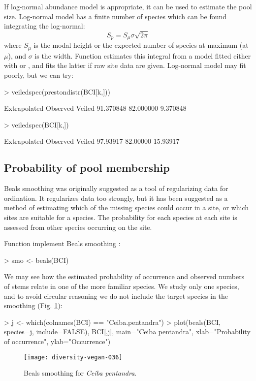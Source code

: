 \documentclass[a4paper,10pt,twocolumn]{article}
\begin{document}
If log-normal abundance model is appropriate, it can be used to
estimate the pool size.  Log-normal model has a finite number of
species which can be found integrating the log-normal:
\begin{equation}
S_p = S_\mu \sigma \sqrt{2 \pi}
\end{equation}
where $S_\mu$ is the modal height or the expected number of species at
maximum (at $\mu$), and $\sigma$ is the width.  Function
 estimates this integral from a model fitted either
with  or , and fits the latter
if raw site data are given.  Log-normal model may fit poorly, but we
can try:
\begin{Schunk}
\begin{Sinput}
> veiledspec(prestondistr(BCI[k,]))
\end{Sinput}
\begin{Soutput}
Extrapolated     Observed       Veiled 
   91.370848    82.000000     9.370848 
\end{Soutput}
\begin{Sinput}
> veiledspec(BCI[k,])
\end{Sinput}
\begin{Soutput}
Extrapolated     Observed       Veiled 
    97.93917     82.00000     15.93917 
\end{Soutput}
\end{Schunk}

\subsection{Probability of pool membership}

Beals smoothing was originally suggested as a tool of regularizing data
for ordination.  It regularizes data too strongly,
but it has been suggested as a method of estimating which of the
missing species could occur in a site, or which sites are suitable for
a species.  The probability for each species at each site is assessed
from other species occurring on the site.

Function  implement Beals smoothing \citep{McCune87,
  DeCaceresLegendre08}:
\begin{Schunk}
\begin{Sinput}
> smo <- beals(BCI)
\end{Sinput}
\end{Schunk}
We may see how the estimated probability of occurrence and observed
numbers of stems relate in one of the more familiar species. We study
only one species, and to avoid circular reasoning we do not include
the target species in the smoothing (Fig. \ref{fig:beals}):
\begin{Schunk}
\begin{Sinput}
> j <- which(colnames(BCI) == "Ceiba.pentandra")
> plot(beals(BCI, species=j, include=FALSE), BCI[,j], 
       main="Ceiba pentandra", xlab="Probability of occurrence",
       ylab="Occurrence")
\end{Sinput}
\end{Schunk}
\begin{figure}
\texttt{[image: diversity-vegan-036]}
\caption{Beals smoothing for \emph{Ceiba pentandra}.}
\label{fig:beals}
\end{figure}


\end{document}
